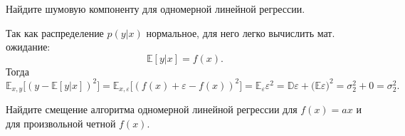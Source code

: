 \documentclass[12pt,fleqn]{article}
\begin{document}
    \begin{vkProblem}
    Найдите шумовую компоненту для одномерной линейной регрессии.  
    	
    \end{vkProblem}
    \begin{esSolution}
    Так как распределение $p(y|x)$ нормальное, для него легко вычислить мат. ожидание:
    \[
    \mathbb{E}[y|x] = f(x).
    \] 	
    Тогда
    \[
    \mathbb{E}_{x, y}\bigl[(y - \mathbb{E}[y|x] )^2\bigr] = 
    \mathbb{E}_{x, \varepsilon}\bigl[(f(x) + \varepsilon - f(x) )^2\bigr] = 
    \mathbb{E}_{\varepsilon} \varepsilon^2 = \mathbb{D}\varepsilon + \bigl(\mathbb{E}\varepsilon\bigr)^2 = \sigma_2^2 + 0 = \sigma_2^2.
    \]
    \end{esSolution}
    \begin{vkProblem}
    	Найдите смещение алгоритма одномерной линейной регрессии для $f(x) = ax$ и для произвольной четной $f(x)$.  
    	
    \end{vkProblem}
\end{document}
